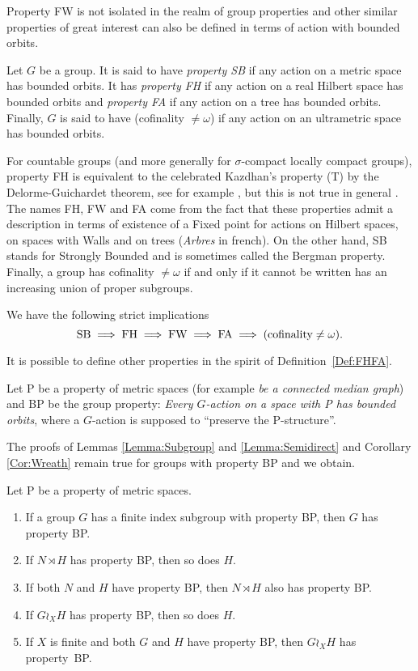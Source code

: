 Property FW is not isolated in the realm of group properties and other similar properties of great interest can also be defined in terms of action with bounded orbits.
\begin{defn}\label{Def:FHFAb}
Let $G$ be a group.
It is said to have \emph{property SB} if any action on a metric space has bounded orbits.
It has \emph{property FH} if any action on a real Hilbert space has bounded orbits and \emph{property FA} if any action on a tree has bounded orbits.
Finally, $G$ is said to have (cofinality $\neq\omega$) if any action on an ultrametric space has bounded orbits.
\end{defn}
For countable groups (and more generally for $\sigma$-compact locally compact groups), property FH is equivalent to the celebrated Kazdhan's property (T) by the Delorme-Guichardet theorem, see for example \cite{MR2415834}, but this is not true in general \cite{MR2240370}.
The names FH, FW and FA come from the fact that these properties admit a description in terms of existence of a Fixed point for actions on Hilbert spaces, on spaces with Walls and on trees (\emph{Arbres} in french).
On the other hand, SB stands for Strongly Bounded and is sometimes called the Bergman property.
Finally, a group has cofinality $\neq\omega$ if and only if it cannot be written has an increasing union of proper subgroups.

We have the following strict implications \cite{MR1432323,MR0476875 ,MR3299841,2013arXiv1302.5982C}
\[
\textnormal{SB}\implies \textnormal{FH}\implies \textnormal{FW}\implies \textnormal{FA}\implies(\textnormal{cofinality}\neq\omega).
\]

It is possible to define other properties in the spirit of Definition~\ref{Def:FHFA}.
\begin{defn}
Let P be a property of metric spaces (for example \emph{be a connected median graph}) and BP be the group property: \emph{Every $G$-action on a space with P has bounded orbits}, where a $G$-action is supposed to ``preserve the P-structure''.
\end{defn}
The proofs of Lemmas \ref{Lemma:Subgroup} and \ref{Lemma:Semidirect} and Corollary \ref{Cor:Wreath} remain true for groups with property BP and we obtain.
\begin{prop}\label{Prop:BP}
Let P be a property of metric spaces.
\begin{enumerate}
\item 
If a group $G$ has a finite index subgroup with property BP, then $G$ has property BP.
\item
If $N\rtimes H$ has property BP, then so does $H$.\label{item:2}
\item
If both $N$ and $H$ have property BP, then $N\rtimes H$ also has property BP.
\item
If $G\wr_X H$ has property BP, then so does $H$.
\item
If $X$ is finite and both $G$ and $H$ have property BP, then $G\wr_X H$ has property~BP.
\end{enumerate}
\end{prop}


